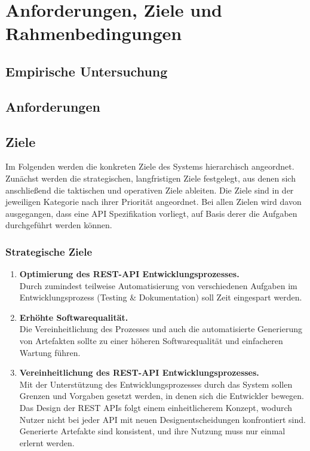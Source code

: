 
\section{Anforderungen, Ziele und Rahmenbedingungen}

\subsection{Empirische Untersuchung}

\subsection{Anforderungen}

\subsection{Ziele}

Im Folgenden werden die konkreten Ziele des Systems hierarchisch angeordnet. Zunächst werden die strategischen, langfristigen Ziele festgelegt, aus denen sich anschließend die taktischen und operativen Ziele ableiten. Die Ziele sind in der jeweiligen Kategorie nach ihrer Priorität angeordnet. Bei allen Zielen wird davon ausgegangen, dass eine API Spezifikation vorliegt, auf Basis derer die Aufgaben durchgeführt werden können.


\subsubsection{Strategische Ziele}

\begin{enumerate}
	\item \textbf{Optimierung des REST-API Entwicklungsprozesses.} \\
	Durch zumindest teilweise Automatisierung von verschiedenen Aufgaben im Entwicklungsprozess (Testing \& Dokumentation) soll Zeit eingespart werden.
	\item \textbf{Erhöhte Softwarequalität.} \\
	Die Vereinheitlichung des Prozesses und auch die automatisierte Generierung von Artefakten sollte zu einer höheren Softwarequalität und einfacheren Wartung führen.
	\item \textbf{Vereinheitlichung des REST-API Entwicklungsprozesses.} \\
	Mit der Unterstützung des Entwicklungsprozesses durch das System sollen Grenzen und Vorgaben gesetzt werden, in denen sich die Entwickler bewegen. Das Design der REST APIs folgt einem einheitlicherem Konzept, wodurch Nutzer nicht bei jeder API mit neuen Designentscheidungen konfrontiert sind. Generierte Artefakte sind konsistent, und ihre Nutzung muss nur einmal erlernt werden.	
\end{enumerate}


